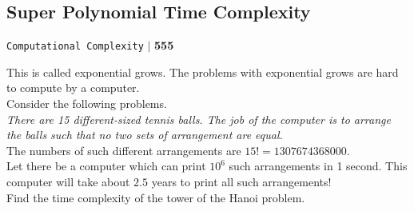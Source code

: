 \documentclass[9pt]{beamer}
\begin{document}
\begin{frame}
\section*{Super Polynomial Time Complexity}
\begin{flushright}
 \texttt{Computational Complexity} \hspace*{0.10cm}\textbf{$|$} \textbf{555}\hspace*{0.5cm}
\end{flushright}

\vspace*{0.5cm}
\hspace*{0.5cm} This is called exponential grows. The problems with exponential grows are hard to compute by a
computer.\\
\hspace*{0.5cm} Consider the following problems.\\

\vspace*{0.2cm}
\emph{There are 15 different-sized tennis balls. The job of the computer is to arrange the balls such that no two
sets of arrangement are equal.}\\


\hspace*{0.5cm} The numbers of such different arrangements are $15! = 1307674368000$.\\
\hspace*{0.5cm} Let there be a computer which can print $10^{6}$ such arrangements in 1 second. This computer will take
about $2.5$ years to print all such arrangements!\\

\vspace*{0.4cm}
\hspace*{0.1cm} Find the time complexity of the tower of the Hanoi problem.\\

\vspace*{0.3cm}
\end{frame}
\end{document}
